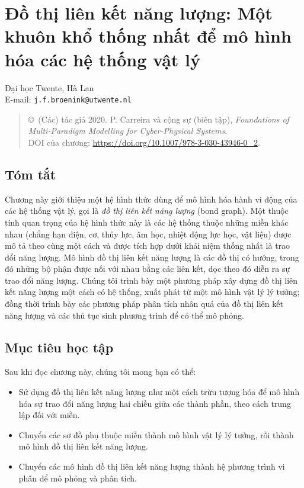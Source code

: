 \chapter{Đồ thị liên kết năng lượng: Một khuôn khổ thống nhất để mô hình hóa các hệ thống vật lý}
\noindent Đại học Twente, Hà Lan\\
\noindent E-mail: \texttt{j.f.broenink@utwente.nl}
\begin{quote}\small
\copyright\ (Các) tác giả 2020. P. Carreira và cộng sự (biên tập),
\emph{Foundations of Multi-Paradigm Modelling for Cyber-Physical Systems}.\\
DOI của chương: \url{https://doi.org/10.1007/978-3-030-43946-0_2}.
\end{quote}

\section*{Tóm tắt}
Chương này giới thiệu một hệ hình thức dùng để mô hình hóa hành vi động của các hệ thống vật lý, gọi là \emph{đồ thị liên kết năng lượng} (bond graph). Một thuộc tính quan trọng của hệ hình thức này là các hệ thống thuộc những miền khác nhau (chẳng hạn điện, cơ, thủy lực, âm học, nhiệt động lực học, vật liệu) được mô tả theo cùng một cách và được tích hợp dưới khái niệm thống nhất là trao đổi năng lượng. Mô hình đồ thị liên kết năng lượng là các đồ thị có hướng, trong đó những bộ phận được nối với nhau bằng các liên kết, dọc theo đó diễn ra sự trao đổi năng lượng. Chúng tôi trình bày một phương pháp xây dựng đồ thị liên kết năng lượng một cách có hệ thống, xuất phát từ một mô hình vật lý lý tưởng; đồng thời trình bày các phương pháp phân tích nhân quả của đồ thị liên kết năng lượng và các thủ tục sinh phương trình để có thể mô phỏng.

\section*{Mục tiêu học tập}
Sau khi đọc chương này, chúng tôi mong bạn có thể:
\begin{itemize}
\item Sử dụng đồ thị liên kết năng lượng như một cách trừu tượng hóa để mô hình hóa sự trao đổi năng lượng hai chiều giữa các thành phần, theo cách trung lập đối với miền.
\item Chuyển các sơ đồ phụ thuộc miền thành mô hình vật lý lý tưởng, rồi thành mô hình đồ thị liên kết năng lượng.
\item Chuyển các mô hình đồ thị liên kết năng lượng thành hệ phương trình vi phân để mô phỏng và phân tích.
\end{itemize}

